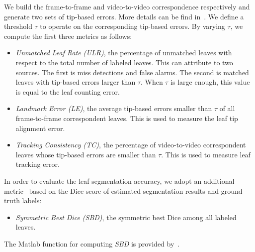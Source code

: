 We build the frame-to-frame and video-to-video correspondence respectively and generate two sets of tip-based errors.
More details can be find in~\cite{yin2015}.
We define a threshold $\tau$ to operate on the corresponding tip-based errors.
By varying $\tau$, we compute the first three metrics as follows:
\begin{itemize}
\item {\it{Unmatched Leaf Rate (ULR)}}, the percentage of unmatched leaves with respect to the total number of labeled leaves.  
This can attribute to two sources.
The first is miss detections and false alarms.
The second is matched leaves with tip-based errors larger than $\tau$.
When $\tau$ is large enough, this value is equal to the leaf counting error.
\item {\it{Landmark Error (LE)}}, the average tip-based errors smaller than $\tau$ of all frame-to-frame correspondent leaves.
This is used to measure the leaf tip alignment error. 
\item {\it{Tracking Consistency (TC)}}, the percentage of video-to-video correspondent leaves whose tip-based errors are smaller than $\tau$.
This is used to measure leaf tracking error. 
\end{itemize}

In order to evaluate the leaf segmentation accuracy, we adopt an additional metric~\cite{scharr2014annotated} based on the Dice score of estimated segmentation results and ground truth labels:
\begin{itemize}
\item {\it{Symmetric Best Dice (SBD)}}, the symmetric best Dice among all labeled leaves.
\end{itemize}
The Matlab function for computing {\it{SBD}} is provided by~\cite{scharr2014annotated}.


%




